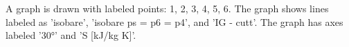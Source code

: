 A graph is drawn with labeled points: 1, 2, 3, 4, 5, 6. The graph shows lines labeled as 'isobare', 'isobare ps = p6 = p4', and 'IG - cutt'. The graph has axes labeled '30°' and 'S [kJ/kg K]'.